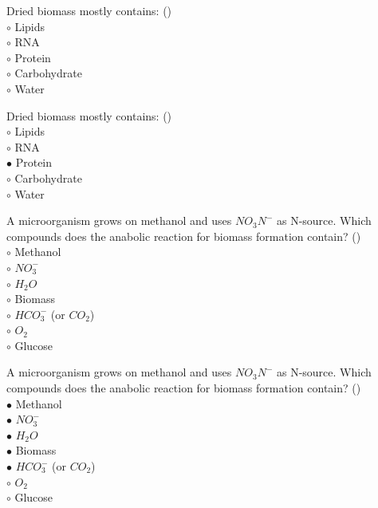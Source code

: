 \documentclass[]{beamer}
\begin{document}
\begin{frame}[shrink] {}
\addtocounter{questions}{1}
\color{blue}
Dried biomass mostly contains:  ()\\
\color{black}
\setlength{\parindent}{-0.4cm}
{\color{red}$\circ$} Lipids\\
{\color{red}$\circ$} RNA\\
{\color{red}$\circ$}  Protein \\
{\color{red}$\circ$} Carbohydrate\\
{\color{red}$\circ$} Water \\
\end{frame}
\begin{frame}[shrink] {}
\addtocounter{answers}{1}
\color{blue}
Dried biomass mostly contains:  ()\\
\color{black}
\setlength{\parindent}{-0.4cm}
{\color{red}$\circ$} Lipids\\
{\color{red}$\circ$} RNA\\
{\color{red}$\bullet$}  Protein \\
{\color{red}$\circ$} Carbohydrate\\
{\color{red}$\circ$} Water \\
\end{frame}

\begin{frame}[shrink] {}
\addtocounter{questions}{1}
\color{blue}
A microorganism grows on methanol and uses $NO_{3}N^{-}$ as N-source. Which compounds does the anabolic reaction for biomass formation contain?   ()\\
\color{black}
\setlength{\parindent}{-0.4cm}
{\color{red}$\circ$}  Methanol\\
{\color{red}$\circ$} $NO_{3}^{-}$\\
{\color{red}$\circ$} ${H_{2}O}$\\
{\color{red}$\circ$} Biomass\\
{\color{red}$\circ$} $HCO_{3}^{-}$ (or $CO_2$)\\
{\color{red}$\circ$} $O_2$\\
{\color{red}$\circ$} Glucose \\
\end{frame}
\begin{frame}[shrink] {}
\addtocounter{answers}{1}
\color{blue}
A microorganism grows on methanol and uses $NO_{3}N^{-}$ as N-source. Which compounds does the anabolic reaction for biomass formation contain?   ()\\
\color{black}
\setlength{\parindent}{-0.4cm}
{\color{red}$\bullet$}  Methanol\\
{\color{red}$\bullet$} $NO_{3}^{-}$\\
{\color{red}$\bullet$} ${H_{2}O}$\\
{\color{red}$\bullet$} Biomass\\
{\color{red}$\bullet$} $HCO_{3}^{-}$ (or $CO_2$)\\
{\color{red}$\circ$} $O_2$\\
{\color{red}$\circ$} Glucose \\
\end{frame}
\end{document}
